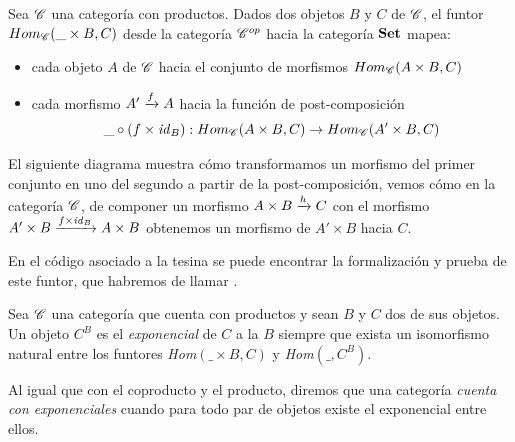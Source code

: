 \begin{definition}\label{homprod}
Sea $\mathscr{C}$ una categoría con productos. Dados dos objetos $B$ y $C$ de $\mathscr{C}$, el funtor $Hom_{\mathscr{C}}(\_\times B, C)$ desde la categoría $\mathscr{C}^{op}$ hacia la categoría $\mathbf{Set}$ mapea:

  \begin{itemize}
  \item cada objeto $A$ de $\mathscr{C}$ hacia el conjunto de morfismos $Hom_{\mathscr{C}}(A\times B, C)$
  \item cada morfismo $ A'\xrightarrow{f}A$ hacia la función de post-composición $$\_ \circ (f \times \mathit{id}_{B}) : Hom_{\mathscr{C}}(A\times B,C) \to Hom_{\mathscr{C}}(A'\times B,C)$$
  \end{itemize}
  El siguiente diagrama muestra cómo transformamos un morfismo del primer conjunto en uno del segundo a partir de la post-composición, vemos cómo en la categoría $\mathscr{C}$, de componer un morfismo $ A\times B\xrightarrow{h}C$ con el morfismo $ A'\times B\xrightarrow{f \times \mathit{id}_{B}}A\times B$ obtenemos un morfismo de $A'\times B$ hacia $C$. 

\begin{center}
  \xymatrixcolsep{4pc} \xymatrixrowsep{4pc}
  \centerline{ \qquad
}
\end{center}
  
\end{definition}

En el código asociado a la tesina se puede encontrar la formalización y prueba de este funtor,  
que habremos de llamar .
    

\begin{definition}\label{cat:exp}
  Sea $\mathscr{C}$ una categoría que cuenta con productos y sean $B$ y $C$ dos de sus objetos. Un objeto $C^{B}$ es el {\it exponencial} de $C$ a la $B$ siempre que exista un isomorfismo natural entre los funtores {\it Hom}$(\_\times B, C)$ y {\it Hom}$(\_, C^{B})$.

  Al igual que con el coproducto y el producto, diremos que una categoría {\it cuenta con exponenciales} cuando para todo par de objetos existe el exponencial entre ellos.
\end{definition}

